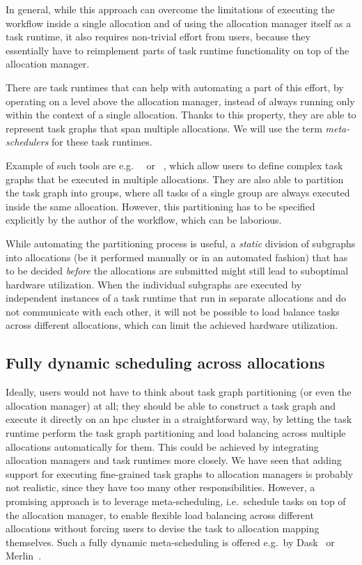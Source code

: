 In general, while this approach can overcome the limitations of executing the workflow inside a
single allocation and of using the allocation manager itself as a task runtime, it also requires
non-trivial effort from users, because they essentially have to reimplement parts of task runtime
functionality on top of the allocation manager.


There are task runtimes that can help with automating a part of this effort, by operating on a
level above the allocation manager, instead of always running only within the context of a single
allocation. Thanks to this property, they are able to represent task graphs that span multiple
allocations. We will use the term \emph{meta-schedulers} for these task runtimes.

Example of such tools are e.g.\ \snakemake~\cite{snakemake} or
\pegasus~\cite{pegasus}, which allow users to define complex task graphs that be
executed in multiple allocations. They are also able to partition the task graph into groups, where
all tasks of a single group are always executed inside the same allocation. However, this
partitioning has to be specified explicitly by the author of the workflow, which can be laborious.

While automating the partitioning process is useful, a \emph{static} division of
subgraphs into allocations (be it performed manually or in an automated fashion) that has to be
decided \emph{before} the allocations are submitted might still lead to suboptimal
hardware utilization. When the individual subgraphs are executed by independent instances of a task
runtime that run in separate allocations and do not communicate with each other, it will not be
possible to load balance tasks across different allocations, which can limit the achieved hardware
utilization.

\subsection*{Fully dynamic scheduling across allocations}
Ideally, users would not have to think about task graph partitioning (or even the allocation
manager) at all; they should be able to construct a task graph and execute it directly on an
\gls{hpc} cluster in a straightforward way, by letting the task runtime perform
the task graph partitioning and load balancing across multiple allocations automatically for them.
This could be achieved by integrating allocation managers and task runtimes more closely. We have
seen that adding support for executing fine-grained task graphs to allocation managers is probably
not realistic, since they have too many other responsibilities. However, a promising approach is to
leverage meta-scheduling, i.e.\ schedule tasks on top of the allocation manager, to enable flexible
load balancing across different allocations without forcing users to devise the task to allocation
mapping themselves. Such a fully dynamic meta-scheduling is offered e.g.\ by
Dask~\cite{dask-jobqueue} or Merlin~\cite{merlin}.

